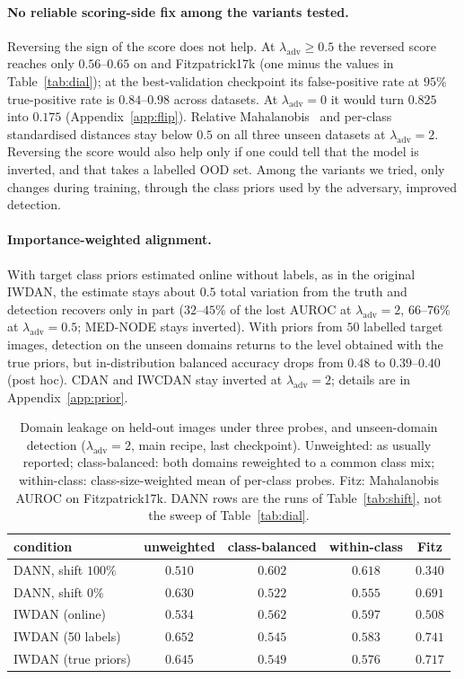 \documentclass{midl}
\newcommand{\lam}{\lambda_{\mathrm{adv}}}
\begin{document}
\paragraph{No reliable scoring-side fix among the variants tested.} Reversing the sign of the
score does not help. At $\lam\ge0.5$ the reversed score reaches only $0.56$--$0.65$ on
\texttt{} and Fitzpatrick17k (one minus the values in Table~\ref{tab:dial}); at the
best-validation checkpoint its false-positive rate at $95\%$ true-positive rate is $0.84$--$0.98$ across
datasets. At $\lam=0$ it would turn $0.825$ into $0.175$ (Appendix~\ref{app:flip}). Relative Mahalanobis~\cite{ren2021relative} and per-class
standardised distances stay below $0.5$ on all three unseen datasets at $\lam=2$. Reversing the score would also help only if one could tell that the model is inverted, and that
takes a labelled OOD set. Among the variants we tried, only changes during training,
through the class priors used by the adversary, improved detection.

\paragraph{Importance-weighted alignment.} With target class priors estimated online without
labels, as in the original IWDAN, the estimate stays about $0.5$ total variation from the truth
and detection recovers only in part ($32$--$45\%$ of the lost AUROC at $\lam=2$, $66$--$76\%$
at $\lam=0.5$; MED-NODE stays inverted). With priors from $50$ labelled target images,
detection on the unseen domains returns to the level obtained with the true priors, but
in-distribution balanced accuracy drops from $0.48$ to $0.39$--$0.40$ (post hoc). CDAN and
IWCDAN stay inverted at $\lam=2$; details are in Appendix~\ref{app:prior}.

\begin{table}[t]
\centering
\caption{Domain leakage on held-out images under three probes, and unseen-domain detection
($\lam=2$, main recipe, last checkpoint). Unweighted: as usually reported; class-balanced:
both domains reweighted to a common class mix; within-class: class-size-weighted mean of
per-class probes. Fitz: Mahalanobis AUROC on Fitzpatrick17k. DANN rows are the runs of Table~\ref{tab:shift}, not the sweep of Table~\ref{tab:dial}.}
\label{tab:probes}
\begin{tabular}{lcccc}
\toprule
condition & unweighted & class-balanced & within-class & Fitz \\
\midrule
DANN, shift $100\%$ & $0.510$ & $0.602$ & $0.618$ & $0.340$ \\
DANN, shift $0\%$ & $0.630$ & $0.522$ & $0.555$ & $0.691$ \\
IWDAN (online) & $0.534$ & $0.562$ & $0.597$ & $0.508$ \\
IWDAN (50 labels) & $0.652$ & $0.545$ & $0.583$ & $0.741$ \\
IWDAN (true priors) & $0.645$ & $0.549$ & $0.576$ & $0.717$ \\
\bottomrule
\end{tabular}
\end{table}
\end{document}
